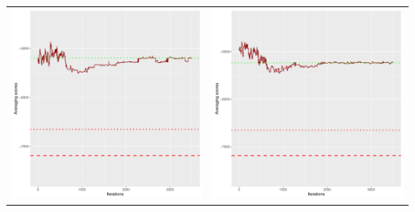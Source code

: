 \documentclass[]{scrartcl}
\begin{document}
\begin{table}[h!]
\begin{tabular}{cc}
\includegraphics[scale = 0.4]{./figs/alarm/v5/30/avgBoundsEvolution-3502.pdf} & 
\includegraphics[scale = 0.4]{./figs/alarm/v5/50/avgBoundsEvolution-3502.pdf} \\

\end{tabular}
\end{table}
\end{document}
